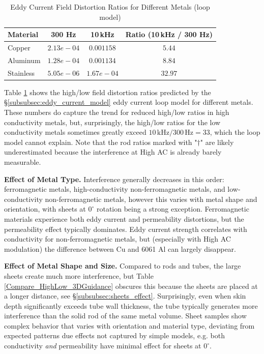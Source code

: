 \documentclass[journal,twoside,web]{ieeecolor}
\begin{document}
\begin{table}[!htbp]
\caption{Eddy Current Field Distortion Ratios for Different Metals (loop model)}
\label{tab:distortion_ratios}
\setlength{\tabcolsep}{4pt}
\centering
\begin{tabular}{|l|c|c|c|}
\hline
Material & 300 Hz & 10\,kHz & Ratio (10\,kHz / 300 Hz) \\ 
\hline
Copper & $2.13e-04$ & $0.001158$ & $5.44$ \\
Aluminum & $1.28e-04$ & $0.001134$ & $8.84$ \\
Stainless & $5.05e-06$ & $1.67e-04$ & $32.97$ \\
\hline
\end{tabular}
\end{table}

Table \ref{tab:distortion_ratios} shows the high/low field distortion ratios predicted by the \S\ref{subsubsec:eddy_current_model} eddy current loop model for different metals. These numbers do capture the trend for reduced high/low ratios in high conductivity metals, but, surprisingly, the high/low ratios for the low conductivity metals sometimes greatly exceed $10\,\mathrm{kHz}/300\,\mathrm{Hz} = 33$, which the loop model cannot explain. Note that the rod ratios marked with "$\dagger$" are likely underestimated because the interference at High AC is already barely measurable. 

\textbf{Effect of Metal Type.}
Interference generally decreases in this order: ferromagnetic metals, high-conductivity non-ferromagnetic metals, and low-conductivity non-ferromagnetic metals, however this varies with metal shape and orientation, with sheets at $0^\circ$ rotation being a strong exception. Ferromagnetic materials experience both eddy current and permeability distortions, but the permeability effect typically dominates. Eddy current strength correlates with conductivity for non-ferromagnetic metals, but (especially with High AC modulation) the difference between Cu and 6061 Al can largely disappear. 

\textbf{Effect of Metal Shape and Size.}
Compared to rods and tubes, the large sheets create much more interference, but Table \ref{Compare_HighLow_3DGuidance} obscures this because the sheets are placed at a longer distance, see \S\ref{subsubsec:sheets_effect}. Surprisingly, even when skin depth significantly exceeds tube wall thickness, the tube typically generates more interference than the solid rod of the same metal volume. Sheet samples show complex behavior that varies with orientation and material type, deviating from expected patterns due effects not captured by simple models, e.g. both conductivity \textit{and} permeability have minimal effect for sheets at $0^\circ$. 
\end{document}
